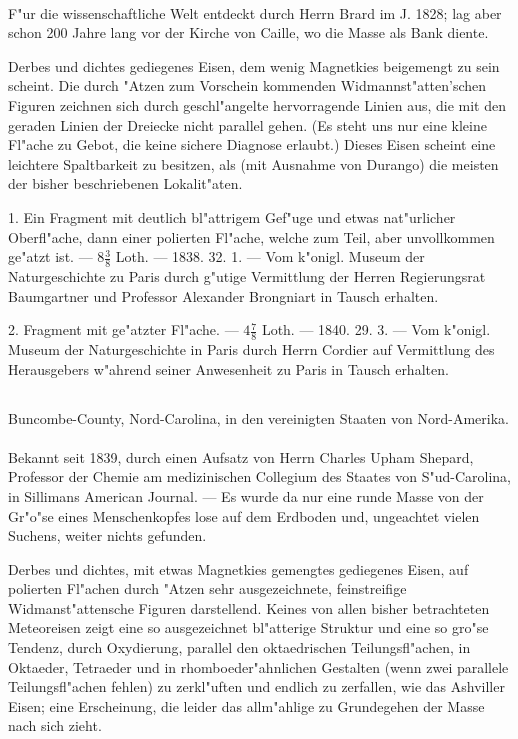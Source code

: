 \documentclass[a4paper, 11pt, oneside, polutonikogreek, german]{article}
\begin{document}
\paragraph{}
F"ur die wissenschaftliche Welt entdeckt durch Herrn Brard im J. 1828; lag aber schon 200 Jahre lang vor der Kirche von Caille, wo die Masse als Bank diente.

Derbes und dichtes gediegenes Eisen, dem wenig Magnetkies beigemengt zu sein scheint. Die durch "Atzen zum Vorschein kommenden Widmannst"atten'schen Figuren zeichnen sich durch geschl"angelte hervorragende Linien aus, die mit den geraden Linien der Dreiecke nicht parallel gehen. (Es steht uns nur eine kleine Fl"ache zu Gebot, die keine sichere Diagnose erlaubt.) Dieses Eisen scheint eine leichtere Spaltbarkeit zu besitzen, als (mit Ausnahme von Durango) die meisten der bisher beschriebenen Lokalit"aten.

1. Ein Fragment mit deutlich bl"attrigem Gef"uge und etwas nat"urlicher Oberfl"ache, dann einer polierten Fl"ache, welche zum Teil, aber unvollkommen ge"atzt ist. --- $\mathfrak{8\frac{3}{8}}$ Loth. --- 1838. 32. 1. --- Vom k"onigl. Museum der Naturgeschichte zu Paris durch g"utige Vermittlung der Herren Regierungsrat Baumgartner und Professor Alexander Brongniart in Tausch erhalten.

2. Fragment mit ge"atzter Fl"ache. --- $\mathfrak{4\frac{7}{8}}$ Loth. --- 1840. 29. 3. --- Vom k"onigl. Museum der Naturgeschichte in Paris durch Herrn Cordier auf Vermittlung des Herausgebers w"ahrend seiner Anwesenheit zu Paris in Tausch erhalten.
\subsection{}
\begin{center}

Buncombe-County, Nord-Carolina, in den vereinigten Staaten von Nord-Amerika.
\end{center}
\paragraph{}
Bekannt seit 1839, durch einen Aufsatz von Herrn Charles Upham Shepard, Professor der Chemie am medizinischen Collegium des Staates von S"ud-Carolina, in Sillimans American Journal. --- Es wurde da nur eine runde Masse von der Gr"o"se eines Menschenkopfes lose auf dem Erdboden und, ungeachtet vielen Suchens, weiter nichts gefunden.

Derbes und dichtes, mit etwas Magnetkies gemengtes gediegenes Eisen, auf polierten Fl"achen durch "Atzen sehr ausgezeichnete, feinstreifige Widmanst"attensche Figuren darstellend. Keines von allen bisher betrachteten Meteoreisen zeigt eine so ausgezeichnet bl"atterige Struktur und eine so gro"se Tendenz, durch Oxydierung, parallel den oktaedrischen Teilungsfl"achen, in Oktaeder, Tetraeder und in rhomboeder"ahnlichen Gestalten (wenn zwei parallele Teilungsfl"achen fehlen) zu zerkl"uften und endlich zu zerfallen, wie das Ashviller Eisen; eine Erscheinung, die leider das allm"ahlige zu Grundegehen der Masse nach sich zieht.
\end{document}
